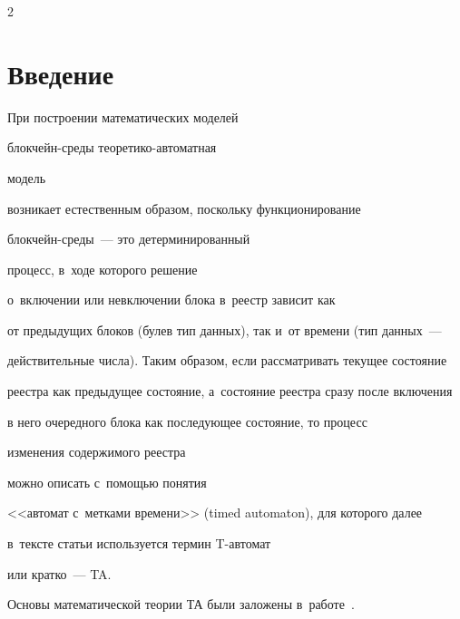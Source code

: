 \thispagestyle{headings}





\begin{multicols}{2}





\label{st\stat}





\section{Введение}







При построении математических моделей\linebreak


 блок\-чейн-сре\-ды тео\-ре\-ти\-ко-ав\-то\-мат\-ная 


модель\linebreak


воз\-ни\-ка\-ет естественным образом, поскольку функ\-ци\-о\-ни\-ро\-ва\-ние 


блок\-чейн-сре\-ды~--- это детерминированный


процесс, в~ходе которого решение 


о~включении или невключении блока в~реестр  зависит как


от предыдущих блоков (булев тип данных), так и~от времени (тип данных~---


действительные чис\-ла). Таким образом,  если рассматривать текущее состояние


реестра как предыдущее состояние, а~состояние реестра сразу после включения


в него очередного блока как последующее состояние, то процесс


изменения содержимого реестра


можно описать с~по\-мощью понятия


<<автомат с~метками времени>> (timed automaton), для которого далее 


в~текс\-те статьи используется термин T-ав\-то\-мат


или кратко~--- TA.





Основы  математической теории ТА были заложены в~работе~\cite{timed-auto}.



\end{multicols}
